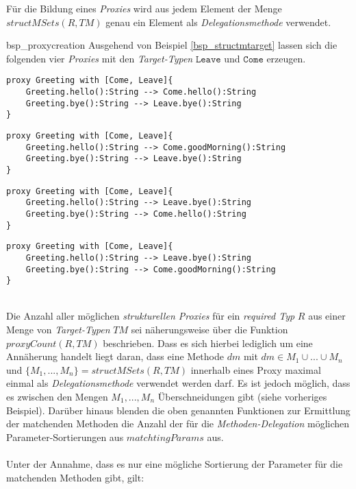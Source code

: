 \noindent
Für die Bildung eines \emph{Proxies} wird aus jedem Element der Menge $structMSets(R,\mathit{TM})$ genau ein Element als \emph{Delegationsmethode} verwendet. 
\begin{example}{bsp_proxycreation}
Ausgehend von Beispiel \ref{bsp_structmtarget} lassen sich die folgenden vier \emph{Proxies} mit den \emph{Target-Typen} $\texttt{Leave}$ und $\texttt{Come}$ erzeugen.
\begin{lstlisting}[style = dsl]
proxy Greeting with [Come, Leave]{
	Greeting.hello():String --> Come.hello():String
	Greeting.bye():String --> Leave.bye():String
}
\end{lstlisting}
\begin{lstlisting}[style = dsl]
proxy Greeting with [Come, Leave]{
	Greeting.hello():String --> Come.goodMorning():String
	Greeting.bye():String --> Leave.bye():String
}
\end{lstlisting}
\begin{lstlisting}[style = dsl]
proxy Greeting with [Come, Leave]{
	Greeting.hello():String --> Leave.bye():String
	Greeting.bye():String --> Come.hello():String
}
\end{lstlisting}
\begin{lstlisting}[style = dsl]
proxy Greeting with [Come, Leave]{
	Greeting.hello():String --> Leave.bye():String
	Greeting.bye():String --> Come.goodMorning():String
}
\end{lstlisting}
\end{example}
\\
Die Anzahl aller möglichen \emph{strukturellen Proxies} für ein \emph{required Typ} $R$ aus einer Menge von \emph{Target-Typen} $\mathit{TM}$ sei näherungsweise über die Funktion $\mathit{proxyCount(R,\mathit{TM})}$ beschrieben. Dass es sich hierbei lediglich um eine Annäherung handelt liegt daran, dass eine Methode $\mathit{dm}$ mit $\mathit{dm} \in M_1 \cup ... \cup M_n$ und $\{M_1,...,M_n\} = \mathit{structMSets(R,TM)}$ innerhalb eines Proxy maximal einmal als \emph{Delegationsmethode} verwendet werden darf. Es ist jedoch möglich, dass es zwischen den Mengen 
$M_1,...,M_n$ Überschneidungen gibt (siehe vorheriges Beispiel). Darüber hinaus blenden die oben genannten Funktionen zur Ermittlung der matchenden Methoden die Anzahl der für die \emph{Methoden-Delegation} möglichen Parameter-Sortierungen aus $\mathit{matchtingParams}$ aus.
\\\\
Unter der Annahme, dass es nur eine mögliche Sortierung der Parameter für die matchenden Methoden gibt, gilt:
